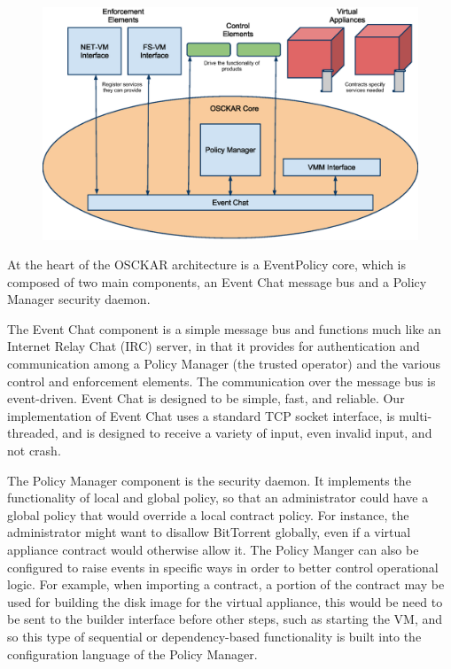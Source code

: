 \begin{figure}[tbp]
\begin{centering}
\label{fig:OSCKAR}
\includegraphics[scale=1.0,angle=90]{figs/OSCKARArchitecture}
\end{centering}
\end{figure}

At the heart of the OSCKAR architecture is a EventPolicy core, which is composed of two main components, an Event Chat message bus and a Policy Manager security daemon. 

The Event Chat component is a simple message bus and functions much like an Internet Relay Chat (IRC) server, in that it provides for authentication and communication among a Policy Manager (the trusted operator) and the various control and enforcement elements. The communication over the message bus is event-driven. Event Chat is designed to be simple, fast, and reliable. Our implementation of Event Chat uses a standard TCP socket interface, is multi-threaded, and is designed to receive a variety of input, even invalid input, and not crash.

The Policy Manager component is the security daemon. It implements the functionality of local and global policy, so that an administrator could have a global policy that would override a local contract policy. For instance, the administrator might want to disallow BitTorrent globally, even if a virtual appliance contract would otherwise allow it. The Policy Manger can also be configured to raise events in specific ways in order to better control operational logic. For example, when importing a contract, a portion of the contract may be used for building the disk image for the virtual appliance, this would be need to be sent to the builder interface before other steps, such as starting the VM, and so this type of sequential or dependency-based functionality is built into the configuration language of the Policy Manager.

